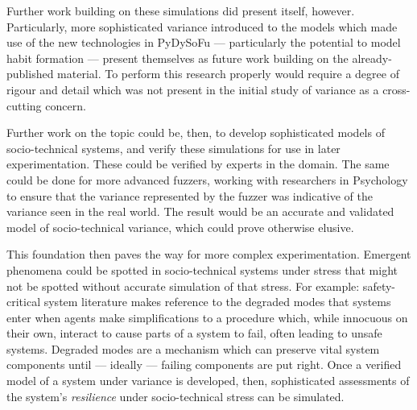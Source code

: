 \documentclass[draft]{article}
\begin{document}
Further work building on these simulations did present itself, however.
Particularly, more sophisticated variance introduced to the models which made
use of the new technologies in PyDySoFu --- particularly the potential to model
habit formation --- present themselves as future work building on the
already-published material. To perform this research properly would require a
degree of rigour and detail which was not present in the initial study of
variance as a cross-cutting concern.\par

Further work on the topic could be, then, to develop sophisticated models of
socio-technical systems, and verify these simulations for use in later
experimentation. These could be verified by experts in the domain. The same
could be done for more advanced fuzzers, working with researchers in Psychology
to ensure that the variance represented by the fuzzer was indicative of the
variance seen in the real world. The result would be an accurate and validated
model of socio-technical variance, which could prove otherwise elusive.\par

This foundation then paves the way for more complex experimentation. Emergent
phenomena could be spotted in socio-technical systems under stress that might not
be spotted without accurate simulation of that stress. For example:
safety-critical system literature makes reference to the degraded modes that
systems enter when agents make simplifications to a procedure which, while
innocuous on their own, interact to cause parts of a system to fail, often
leading to unsafe systems. Degraded modes are a mechanism which can preserve
vital system components until --- ideally --- failing components are put
right. Once a verified model of a system under variance is developed, then,
sophisticated assessments of the system's \emph{resilience} under
socio-technical stress can be simulated.\par
\end{document}
